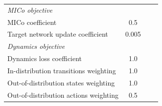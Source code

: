 \begin{table}[!htb]
\begin{center}
{\begin{tabular}{lccc}
\addlinespace[10pt]
\emph{MICo objective} & \\
MICo coefficient & 0.5 \\
Target network update coefficient & 0.005 \\

\addlinespace[10pt]
\emph{Dynamics objective} & & & \\
Dynamics loss coefficient & 1.0  \\
In-distribution transitions weighting & 1.0  \\
Out-of-distribution states weighting & 1.0  \\
Out-of-distribution actions weighting & 0.5\\

\bottomrule 
\end{tabular}
}
\end{center}
\end{table}